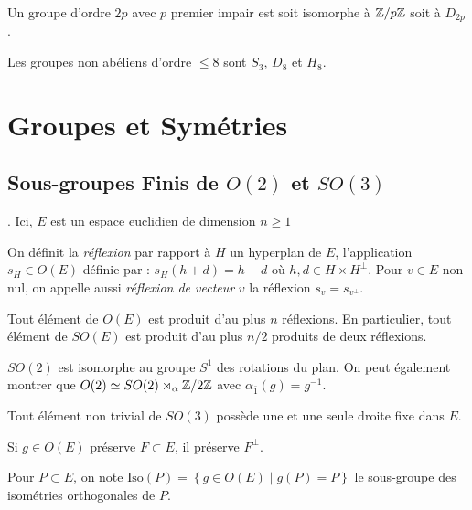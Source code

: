 \documentclass{cours}
\begin{document}
\begin{proposition}
    Un groupe d'ordre $2p$ avec $p$ premier impair est soit isomorphe à $\mathbb{Z}/p\mathbb{Z}$ soit à $D_{2p}$.
\end{proposition}

\begin{proposition}
    Les groupes non abéliens d'ordre $\leq 8$ sont $S_{3}$, $D_{8}$ et $H_{8}$.
\end{proposition}

\newpage
\section{Groupes et Symétries}
\subsection{Sous-groupes Finis de $O(2)$ et $SO(3)$}.
Ici, $E$ est un espace euclidien de dimension $n \geq 1$
\begin{definition}
    On définit la \emph{réflexion} par rapport à $H$ un hyperplan de $E$, l'application $s_{H} \in O(E)$ définie par : $s_{H}(h + d) = h - d$ où $h, d \in H \times H^{\perp}$. Pour $v \in E$ non nul, on appelle aussi \emph{réflexion de vecteur } $v$ la réflexion $s_{v} = s_{v^{\perp}}$.
\end{definition}

\begin{theorem}
    Tout élément de $O(E)$ est produit d'au plus $n$ réflexions. En particulier, tout élément de $SO(E)$ est produit d'au plus $n/2$ produits de deux réflexions.
\end{theorem}
\begin{remark}
    $SO(2)$ est isomorphe au groupe $S^{1}$ des rotations du plan. On peut également montrer que $O(2) \simeq SO(2) \rtimes_{\alpha} \mathbb{Z}/2\mathbb{Z}$ avec $\alpha_{\bar{1}}(g) = g^{-1}$.
\end{remark}

\begin{corollary}
    Tout élément non trivial de $SO(3)$ possède une et une seule droite fixe dans $E$.
\end{corollary}

\begin{lemma}
    Si $g\in O(E)$ préserve $F \subset E$, il préserve $F^{\perp}$.
\end{lemma}

\begin{definition}
    Pour $P \subset E$, on note $\text{Iso}(P) = \left\{g \in O(E) \mid g(P) = P\right\}$ le sous-groupe des isométries orthogonales de $P$.
\end{definition}
\end{document}
